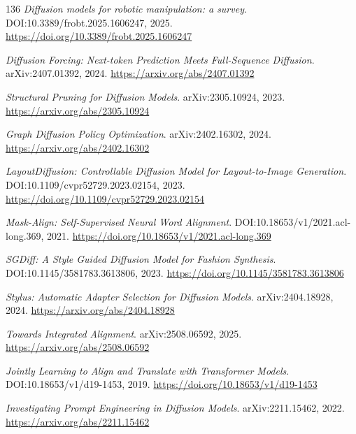\documentclass[11pt,a4paper]{article}
\begin{document}
\begin{thebibliography}{136}
\newblock \emph{Diffusion models for robotic manipulation: a survey}.
\newblock DOI:10.3389/frobt.2025.1606247, 2025.
\newblock \url{https://doi.org/10.3389/frobt.2025.1606247}

\newblock \emph{Diffusion Forcing: Next-token Prediction Meets Full-Sequence Diffusion}.
\newblock arXiv:2407.01392, 2024.
\newblock \url{https://arxiv.org/abs/2407.01392}

\newblock \emph{Structural Pruning for Diffusion Models}.
\newblock arXiv:2305.10924, 2023.
\newblock \url{https://arxiv.org/abs/2305.10924}

\newblock \emph{Graph Diffusion Policy Optimization}.
\newblock arXiv:2402.16302, 2024.
\newblock \url{https://arxiv.org/abs/2402.16302}

\newblock \emph{LayoutDiffusion: Controllable Diffusion Model for Layout-to-Image Generation}.
\newblock DOI:10.1109/cvpr52729.2023.02154, 2023.
\newblock \url{https://doi.org/10.1109/cvpr52729.2023.02154}

\newblock \emph{Mask-Align: Self-Supervised Neural Word Alignment}.
\newblock DOI:10.18653/v1/2021.acl-long.369, 2021.
\newblock \url{https://doi.org/10.18653/v1/2021.acl-long.369}

\newblock \emph{SGDiff: A Style Guided Diffusion Model for Fashion Synthesis}.
\newblock DOI:10.1145/3581783.3613806, 2023.
\newblock \url{https://doi.org/10.1145/3581783.3613806}

\newblock \emph{Stylus: Automatic Adapter Selection for Diffusion Models}.
\newblock arXiv:2404.18928, 2024.
\newblock \url{https://arxiv.org/abs/2404.18928}

\newblock \emph{Towards Integrated Alignment}.
\newblock arXiv:2508.06592, 2025.
\newblock \url{https://arxiv.org/abs/2508.06592}

\newblock \emph{Jointly Learning to Align and Translate with Transformer Models}.
\newblock DOI:10.18653/v1/d19-1453, 2019.
\newblock \url{https://doi.org/10.18653/v1/d19-1453}

\newblock \emph{Investigating Prompt Engineering in Diffusion Models}.
\newblock arXiv:2211.15462, 2022.
\newblock \url{https://arxiv.org/abs/2211.15462}


\end{thebibliography}
\end{document}
